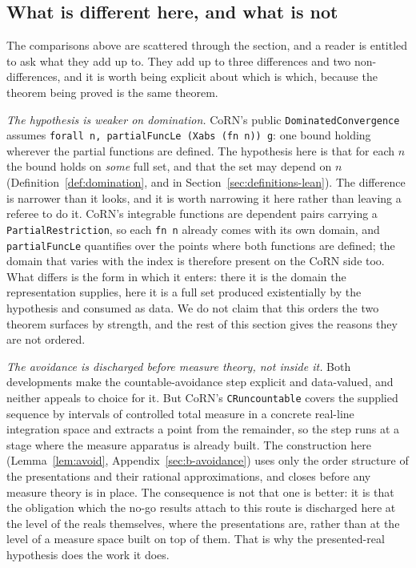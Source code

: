 \documentclass[11pt]{article}
\theoremstyle{definition}
\theoremstyle{remark}
\begin{document}
\subsection{What is different here, and what is not}
\label{sec:differential}

The comparisons above are scattered through the section, and a reader is entitled to
ask what they add up to.  They add up to three differences and two non-differences,
and it is worth being explicit about which is which, because the theorem being
proved is the same theorem.

\emph{The hypothesis is weaker on domination.}  CoRN's public
\texttt{DominatedConvergence} assumes \texttt{forall n, partialFuncLe (Xabs (fn n)) g}:
one bound holding wherever the partial functions are defined.  The hypothesis here is
that for each $n$ the bound holds on \emph{some} full set, and that the set may depend
on $n$ (Definition~\ref{def:domination}, and  in
Section~\ref{sec:definitions-lean}).  The difference is narrower than it looks, and it is worth
narrowing it here rather than leaving a referee to do it.  CoRN's integrable
functions are dependent pairs carrying a \texttt{PartialRestriction}, so each
\texttt{fn n} already comes with its own domain, and \texttt{partialFuncLe}
quantifies over the points where both functions are defined; the domain that varies
with the index is therefore present on the CoRN side too.  What differs is the form
in which it enters: there it is the domain the representation supplies, here it is a
full set produced existentially by the hypothesis and consumed as data.  We do not
claim that this orders the two theorem surfaces by strength, and the rest of this
section gives the reasons they are not ordered.

\emph{The avoidance is discharged before measure theory, not inside it.}  Both
developments make the countable-avoidance step explicit and data-valued, and neither
appeals to choice for it.  But CoRN's \texttt{CRuncountable} covers the supplied
sequence by intervals of controlled total measure in a concrete real-line integration
space and extracts a point from the remainder, so the step runs at a stage where the
measure apparatus is already built.  The construction here (Lemma~\ref{lem:avoid},
Appendix~\ref{sec:b-avoidance}) uses only the order structure of the presentations and
their rational approximations, and closes before any measure theory is in place.  The
consequence is not that one is better: it is that the obligation which the no-go
results attach to this route is discharged here at the level of the reals themselves,
where the presentations are, rather than at the level of a measure space built on top
of them.  That is why the presented-real hypothesis does the work it does.
\end{document}
